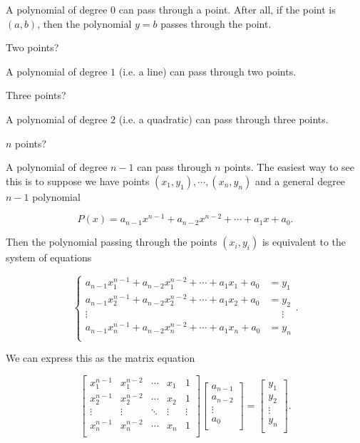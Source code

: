 \documentclass[../gatm_answers.tex]{subfiles}
\begin{document}
A polynomial of degree $0$ can pass through a point. After all, if the point is $(a,b)$, then the polynomial $y=b$ passes through the point.

\begin{iinner_problem}
\item Two points?
\end{iinner_problem}

A polynomial of degree $1$ (i.e. a line) can pass through two points.

\begin{iinner_problem}
\item Three points?
\end{iinner_problem}

A polynomial of degree $2$ (i.e. a quadratic) can pass through three points.

\begin{iinner_problem}
\item $n$ points?
\end{iinner_problem}

A polynomial of degree $n-1$ can pass through $n$ points. The easiest way to see this is to suppose we have points $(x_1,y_1), \cdots, (x_n,y_n)$ and a general degree $n-1$ polynomial

$$P(x)=a_{n-1}x^{n-1}+a_{n-2}x^{n-2}+\cdots+a_1x+a_0.$$

Then the polynomial passing through the points $(x_i,y_i)$ is equivalent to the system of equations

$$\left\{\begin{aligned}
a_{n-1}x_1^{n-1}+a_{n-2}x_1^{n-2}+\cdots+a_1x_1+a_0 &= y_1 \\
a_{n-1}x_2^{n-1}+a_{n-2}x_2^{n-2}+\cdots+a_1x_2+a_0 &= y_2 \\
\vdots &\phantom{=} \vdots \\
a_{n-1}x_n^{n-1}+a_{n-2}x_n^{n-2}+\cdots+a_1x_n+a_0 &= y_n \\
\end{aligned}\right..$$

We can express this as the matrix equation

$$\begin{bmatrix}
x_1^{n-1} & x_1^{n-2} & \cdots & x_1 & 1 \\
x_2^{n-1} & x_2^{n-2} & \cdots & x_2 & 1 \\
\vdots & \vdots & \ddots & \vdots & \vdots \\
x_n^{n-1} & x_n^{n-2} & \cdots & x_n & 1 \\
\end{bmatrix}\begin{bmatrix}
a_{n-1} \\ a_{n-2} \\ \vdots \\ a_0 \\
\end{bmatrix} = \begin{bmatrix}
y_1 \\ y_2 \\ \vdots \\ y_n \\
\end{bmatrix}.$$
\end{document}
